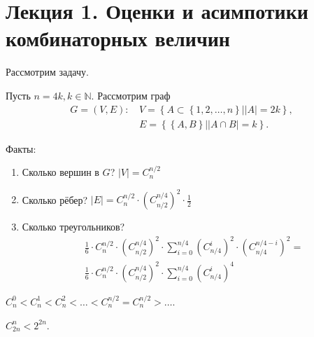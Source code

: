 



\title{}

\author{Фёдор Алексеев}

\maketitle
\tableofcontents\newpage{}

\part{Лекция 1. Оценки и асимпотики комбинаторных величин}

\begin{example} Рассмотрим задачу.

  Пусть $n = 4k, k \in \mathbb{N}$. Рассмотрим граф 
  \begin{align*}
	G = (V,E)\mbox{: } &V = \left\{A \subset \left\{1, 2, \ldots, n\right\}| |A| = 2k\right\}, \\
	&E = \left\{ \left\{ A,B \right\}| |A \cap B| = k \right\}.
  \end{align*}

  Факты:
  \begin{enumerate}
	\item Сколько вершин в $G$? $|V| = C_n^{n/2}$
	\item Сколько рёбер? $|E| = C_n^{n/2} \cdot \left( C_{n/2}^{n/4} \right)^2 \cdot \frac{1}{2}$
	\item Сколько треугольников? 
	  \begin{align*}
		&\frac{1}{6} \cdot C_n^{n/2} \cdot \left( C_{n/2}^{n/4} \right)^2 \cdot 
		\sum_{i=0}^{n/4}\left( C_{n/4}^{i} \right)^2 \cdot \left( C_{n/4}^{n/4-i} \right)^2 = \\
		&\frac{1}{6} \cdot C_n^{n/2} \cdot \left( C_{n/2}^{n/4} \right)^2 \cdot \sum_{i=0}^{n/4}\left( C_{n/4}^{i} \right)^4
	  \end{align*}
  \end{enumerate}
\end{example}

\begin{claim}
  \(
	C_{n}^{0} < C_{n}^{1} < C_{n}^{2} < \ldots < C_{n}^{n/2} = C_{n}^{n/2} > \ldots
  \).
\end{claim}

\begin{claim}
  $C_{2n}^{n} < 2^{2n}$.
\end{claim}

